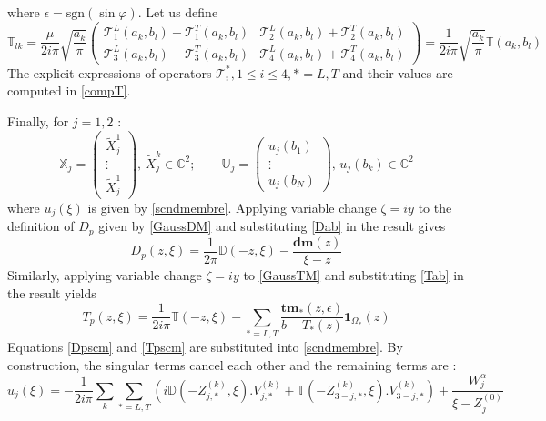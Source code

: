 where $\epsilon= \mbox{sgn}( \sin \varphi)$. Let us define
\begin{equation}
\mathbb{T}_{lk}=\frac{\mu}{2i\pi}\sqrt{\frac{a_k}{\pi}}
\begin{pmatrix}
\mathcal{T}_1^L(a_k,b_l)+ \mathcal{T}_1^T(a_k,b_l)  &  \mathcal{T}_2^L(a_k,b_l) + \mathcal{T}_2^T(a_k,b_l)  \\
 \mathcal{T}_3^L(a_k,b_l)+ \mathcal{T}_3^T(a_k,b_l) &\mathcal{T}_4^L(a_k,b_l)+ \mathcal{T}_4^T(a_k,b_l)
\end{pmatrix}
=\frac{1}{2i\pi}\sqrt{\frac{a_k}{\pi}}\mathbb{T}(a_k,b_l)
\label{Tab}
\end{equation}
The explicit expressions of operators $\mathcal{T}_i^*, 1\leq i\leq4, *=L,T$ and their values are computed in \ref{compT}.

Finally, for $j=1,2$ :
\begin{equation}
\mathbb{X}_j=\begin{pmatrix}
\tilde{X}^1_j \\
\vdots \\
\tilde{X}^1_j
\end{pmatrix}, \,
\tilde{X}^k_j \in \mathbb{C}^2; \hspace{2em}
\mathbb{U}_j=\begin{pmatrix}
u_j(b_1)\\
\vdots \\
u_j(b_N)
\end{pmatrix}, \,
u_j(b_k) \in \mathbb{C}^2
\end{equation}
where $u_j(\xi)$ is given by \eqref{scndmembre}. Applying variable change $\zeta=iy$ to the definition of $D_p$ given by 
\eqref{GaussDM} and substituting \eqref{Dab} in the result gives
\begin{equation}
D_p(z,\xi)=\frac{1}{2\pi}\mathbb{D}(-z,\xi)-\frac{\textbf{dm}(z)}{\xi-z}
\label{Dpscm}
\end{equation}
Similarly, applying variable change $\zeta=iy$ to \eqref{GaussTM} and substituting \eqref{Tab} in the result yields
\begin{equation}
T_p(z,\xi)=\frac{1}{2i\pi}\mathbb{T}(-z,\xi)- \sum_{*=L,T}\frac{\textbf{tm}_*(z,\epsilon)}{b-T_*(z)}\textbf{1}_{\Omega_*}(z)
\label{Tpscm}
\end{equation}
Equations \eqref{Dpscm} and \eqref{Tpscm} are substituted into \eqref{scndmembre}. By construction, the singular terms cancel each other and the remaining terms are :
\begin{equation}
u_j(\xi)=-\frac{1}{2i\pi}\sum_{k}\sum_{*=L,T}\left(i\mathbb{D}(-Z_{j,*}^{(k)},\xi).V_{j,*}^{(k)}+\mathbb{T}(-Z_{3-j,*}^{(k)},\xi).V_{3-j,*}^{(k)} \right) +\frac{W_j^{\alpha}}{\xi-Z_j^{(0)}}
\label{uDT}
\end{equation}

